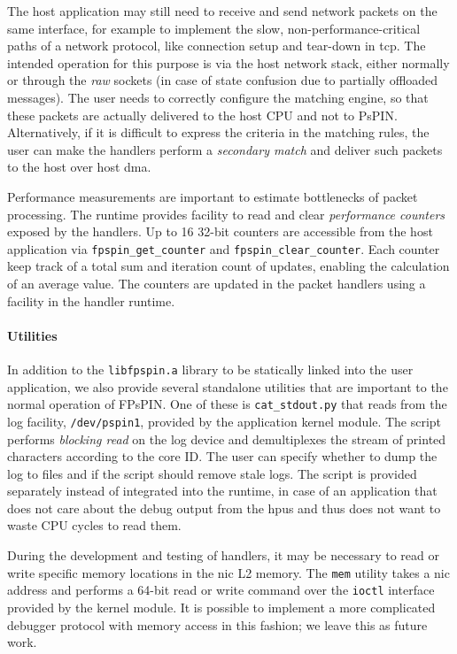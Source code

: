 The host application may still need to receive and send network packets on the same interface, for example to implement the slow, non-performance-critical paths of a network protocol, like connection setup and tear-down in \ac{tcp}.  The intended operation for this purpose is via the host network stack, either normally or through the \emph{raw} sockets (in case of state confusion due to partially offloaded messages).  The user needs to correctly configure the matching engine, so that these packets are actually delivered to the host CPU and not to PsPIN.  Alternatively, if it is difficult to express the criteria in the matching rules, the user can make the handlers perform a \emph{secondary match} and deliver such packets to the host over host \ac{dma}.

Performance measurements are important to estimate bottlenecks of packet processing.  The runtime provides facility to read and clear \emph{performance counters} exposed by the handlers.  Up to 16 32-bit counters are accessible from the host application via \texttt{fpspin\_\-get\_\-counter} and \texttt{fpspin\_\-clear\_\-counter}.  Each counter keep track of a total sum and iteration count of updates, enabling the calculation of an average value.  The counters are updated in the packet handlers using a facility in the handler runtime.

\paragraph{Utilities} In addition to the \texttt{libfpspin.a} library to be statically linked into the user application, we also provide several standalone utilities that are important to the normal operation of FPsPIN.  One of these is \texttt{cat\_stdout.py} that reads from the log facility, \texttt{/dev/pspin1}, provided by the application kernel module.  The script performs \emph{blocking read} on the log device and demultiplexes the stream of printed characters according to the core ID.  The user can specify whether to dump the log to files and if the script should remove stale logs.  The script is provided separately instead of integrated into the runtime, in case of an application that does not care about the debug output from the \ac{hpu}s and thus does not want to waste CPU cycles to read them.

During the development and testing of handlers, it may be necessary to read or write specific memory locations in the \ac{nic} L2 memory.  The \texttt{mem} utility takes a \ac{nic} address and performs a 64-bit read or write command over the \texttt{ioctl} interface provided by the kernel module.  It is possible to implement a more complicated debugger protocol with memory access in this fashion; we leave this as future work.

